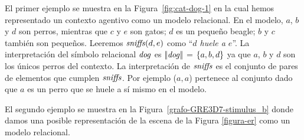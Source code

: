 El primer ejemplo se muestra en la Figura~\ref{fig:cat-dog-1} en la cual hemos representado un contexto agentivo como un modelo relacional. En el modelo, $a$, $b$ y $d$ son perros, mientras que 
$c$ y $e$ son gatos;  $d$ es un peque\~no beagle; $b$ y $c$ tambi\'en son peque\~nos.
 Leeremos $\mathit{sniffs}(d,e)$ como ``{\em $d$ huele a $e$}''. La interpretaci\'on del s\'imbolo relacional $\mathit{dog}$ es $|\!|\mathit{dog}|\!|$  =  $\{a,b,d\}$ ya que $a$, $b$ y $d$ son los \'unicos perros del contexto. La interpretaci\'on de $\mathit{sniffs}$ es el conjunto de pares de elementos que cumplen $\mathit{sniffs}$. Por ejemplo ($a,a$) pertenece al conjunto dado que $a$ es un perro que se huele a s\'i mismo en el modelo.

El segundo ejemplo se muestra en la Figura~\ref{grafo-GRE3D7-stimulus_b} donde damos una posible representaci\'on de la escena de la Figura \ref{figura-er} como un modelo relacional. 

